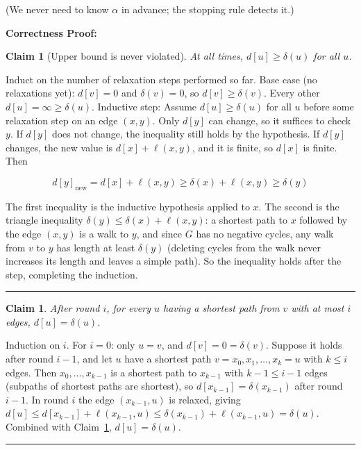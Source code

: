 \documentclass[11pt]{article}
\newenvironment{proof}{{\bf Proof:  }}{\hfill\rule{2mm}{2mm}}
\newtheorem{claim}[fact]{Claim}
\begin{document}
(We never need to know $\alpha$ in advance; the stopping rule detects it.)

\medskip

\textbf{Correctness Proof:}

\begin{claim}[Upper bound is never violated]\label{cl:lower}
At all times, $d[u] \ge \delta(u)$ for all $u$.
\end{claim}

\begin{proof}
Induct on the number of relaxation steps performed so far. Base case (no relaxations yet): $d[v] = 0$ and $\delta(v) = 0$, so $d[v] \ge \delta(v)$. 
Every other $d[u] = \infty \ge \delta(u)$. Inductive step: Assume $d[u] \ge \delta(u)$ for all $u$ before some relaxation step on an edge $(x,y)$. 
Only $d[y]$ can change, so it suffices to check $y$. If $d[y]$ does not change, the inequality still holds by the hypothesis. 
If $d[y]$ changes, the new value is $d[x] + \ell(x,y)$, and it is finite, so $d[x]$ is finite. Then

$$d[y]_{\text{new}} = d[x] + \ell(x,y) \ge \delta(x) + \ell(x,y) \ge \delta(y)$$

The first inequality is the inductive hypothesis applied to $x$. The second is the triangle inequality $\delta(y)\le\delta(x)+\ell(x,y)$: 
a shortest path to $x$ followed by the edge $(x,y)$ is a walk to $y$, and since $G$ has no negative cycles, 
any walk from $v$ to $y$ has length at least $\delta(y)$ (deleting cycles from the walk never increases its length and leaves a simple path). 
So the inequality holds after the step, completing the induction.
\end{proof}

\begin{claim}\label{cl:rounds}
After round $i$, for every $u$ having a shortest path from $v$ with at most $i$ edges, $d[u]=\delta(u)$.
\end{claim}

\begin{proof}
Induction on $i$. For $i = 0$: only $u = v$, and $d[v] = 0 = \delta(v)$. Suppose it holds after round $i-1$, 
and let $u$ have a shortest path $v = x_0, x_1, \dots, x_k = u$ with $k \le i$ edges. 
Then $x_0, \dots, x_{k-1}$ is a shortest path to $x_{k-1}$ with $k-1 \le i-1$ edges (subpaths of shortest paths are shortest), 
so $d[x_{k-1}] = \delta(x_{k-1})$ after round $i-1$. In round $i$ the edge $(x_{k-1}, u)$ is relaxed, giving 
$d[u] \le d[x_{k-1}] + \ell(x_{k-1},u) \le \delta(x_{k-1}) + \ell(x_{k-1},u) = \delta(u)$. Combined with Claim~\ref{cl:lower}, $d[u]=\delta(u)$.
\end{proof}
\end{document}
